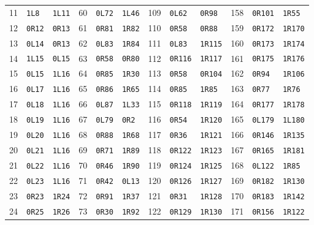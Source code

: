 \begin{center}
\begin{tabular}{rll@{\qquad}rll@{\qquad}rll@{\qquad}rll}
11 & \texttt{1L8} & \texttt{1L11} & 60 & \texttt{0L72} & \texttt{1L46} & 109 & \texttt{0L62} & \texttt{0R98} & 158 & \texttt{0R101} & \texttt{1R55}\\
12 & \texttt{0R12} & \texttt{0R13} & 61 & \texttt{0R81} & \texttt{1R82} & 110 & \texttt{0R58} & \texttt{0R88} & 159 & \texttt{0R172} & \texttt{1R170}\\
13 & \texttt{0L14} & \texttt{0R13} & 62 & \texttt{0L83} & \texttt{1R84} & 111 & \texttt{0L83} & \texttt{1R115} & 160 & \texttt{0R173} & \texttt{1R174}\\
14 & \texttt{1L15} & \texttt{0L15} & 63 & \texttt{0R58} & \texttt{0R80} & 112 & \texttt{0R116} & \texttt{1R117} & 161 & \texttt{0R175} & \texttt{1R176}\\
15 & \texttt{0L15} & \texttt{1L16} & 64 & \texttt{0R85} & \texttt{1R30} & 113 & \texttt{0R58} & \texttt{0R104} & 162 & \texttt{0R94} & \texttt{1R106}\\
16 & \texttt{0L17} & \texttt{1L16} & 65 & \texttt{0R86} & \texttt{1R65} & 114 & \texttt{0R85} & \texttt{1R85} & 163 & \texttt{0R77} & \texttt{1R76}\\
17 & \texttt{0L18} & \texttt{1L16} & 66 & \texttt{0L87} & \texttt{1L33} & 115 & \texttt{0R118} & \texttt{1R119} & 164 & \texttt{0R177} & \texttt{1R178}\\
18 & \texttt{0L19} & \texttt{1L16} & 67 & \texttt{0L79} & \texttt{0R2} & 116 & \texttt{0R54} & \texttt{1R120} & 165 & \texttt{0L179} & \texttt{1L180}\\
19 & \texttt{0L20} & \texttt{1L16} & 68 & \texttt{0R88} & \texttt{1R68} & 117 & \texttt{0R36} & \texttt{1R121} & 166 & \texttt{0R146} & \texttt{1R135}\\
20 & \texttt{0L21} & \texttt{1L16} & 69 & \texttt{0R71} & \texttt{1R89} & 118 & \texttt{0R122} & \texttt{1R123} & 167 & \texttt{0R165} & \texttt{1R181}\\
21 & \texttt{0L22} & \texttt{1L16} & 70 & \texttt{0R46} & \texttt{1R90} & 119 & \texttt{0R124} & \texttt{1R125} & 168 & \texttt{0L122} & \texttt{1R85}\\
22 & \texttt{0L23} & \texttt{1L16} & 71 & \texttt{0R42} & \texttt{0L13} & 120 & \texttt{0R126} & \texttt{1R127} & 169 & \texttt{0R182} & \texttt{1R130}\\
23 & \texttt{0R23} & \texttt{1R24} & 72 & \texttt{0R91} & \texttt{1R37} & 121 & \texttt{0R31} & \texttt{1R128} & 170 & \texttt{0R183} & \texttt{1R142}\\
24 & \texttt{0R25} & \texttt{1R26} & 73 & \texttt{0R30} & \texttt{1R92} & 122 & \texttt{0R129} & \texttt{1R130} & 171 & \texttt{0R156} & \texttt{1R122}\\

\end{tabular}
\end{center}

